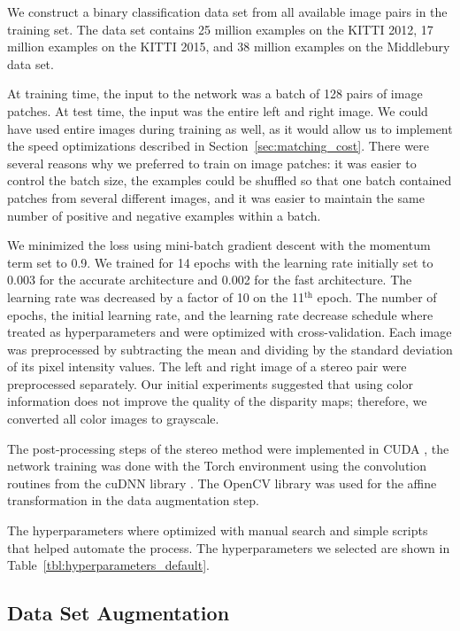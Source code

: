 \documentclass[twoside,11pt]{article}
\begin{document}
We construct a binary classification data set from all available image pairs
in the training set. The data set contains 25 million examples on the KITTI
2012, 17 million examples on the KITTI 2015, and 38 million examples on the
Middlebury data set. 

At training time, the input to the network was a batch of 128 pairs of image
patches. At test time, the input was the entire left and right image. We could
have used entire images during training as well, as it would allow us to
implement the speed optimizations described in Section~\ref{sec:matching_cost}.
There were several reasons why we preferred to train on image patches: it was
easier to control the batch size, the examples could be shuffled so that one
batch contained patches from several different images, and it was easier to
maintain the same number of positive and negative examples within a batch. 

We minimized the loss using mini-batch gradient descent with the momentum term
set to 0.9. We trained for 14 epochs with the learning rate initially set to
0.003 for the accurate architecture and 0.002 for the fast architecture. The
learning rate was decreased by a factor of 10 on the 11$^{\text{th}}$ epoch.
The number of epochs, the initial learning rate, and the learning rate decrease
schedule where treated as hyperparameters and were optimized with
cross-validation. Each image was preprocessed by subtracting the mean and
dividing by the standard deviation of its pixel intensity values. The left and
right image of a stereo pair were preprocessed separately. Our initial
experiments suggested that using color information does not improve the quality
of the disparity maps; therefore, we converted all color images to grayscale.

The post-processing steps of the stereo method were implemented in CUDA
\citep{nickolls2008scalable}, the network training was done with the Torch
environment \citep{collobert2011torch7} using the convolution routines from
the cuDNN library \citep{chetlur2014cudnn}. The OpenCV library
\citep{opencv_library} was used for the affine transformation in the data
augmentation step. 

The hyperparameters where optimized with manual search and simple scripts that
helped automate the process. The hyperparameters we selected are shown in
Table~\ref{tbl:hyperparameters_default}.

\subsection{Data Set Augmentation}
\label{sec:dataset_augmentation}
\end{document}
